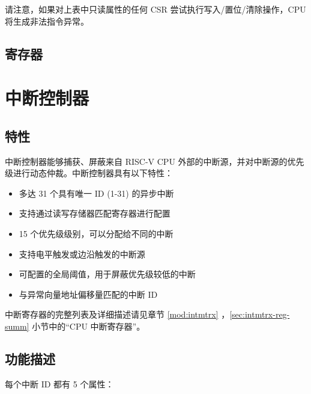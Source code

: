 \documentclass[main\_\_CN.tex]{subfiles}
\begin{document}
请注意，如果对上表中只读属性的任何 CSR 尝试执行写入/置位/清除操作，CPU 将生成非法指令异常。

\subsection{寄存器}




\clearpage
\section{中断控制器}
\label{sec:riscvcpu-int-ctrl}

\subsection{特性}
\label{sec:riscvcpu-int-features}
中断控制器能够捕获、屏蔽来自 RISC-V CPU 外部的中断源，并对中断源的优先级进行动态仲裁。中断控制器具有以下特性：

\begin{itemize}
    \item 多达 31 个具有唯一 ID (1-31) 的异步中断
    \item 支持通过读写存储器匹配寄存器进行配置
    \item 15 个优先级级别，可以分配给不同的中断
    \item 支持电平触发或边沿触发的中断源
    \item 可配置的全局阈值，用于屏蔽优先级较低的中断
    \item 与异常向量地址偏移量匹配的中断 ID
\end{itemize}

中断寄存器的完整列表及详细描述请见章节 \ref{mod:intmtrx} \textit{}，\ref{sec:intmtrx-reg-summ} 小节中的“CPU 中断寄存器”。

\subsection{功能描述}
\label{sec:riscvcpu-int-func-descr}

每个中断 ID 都有 5 个属性：
\end{document}
